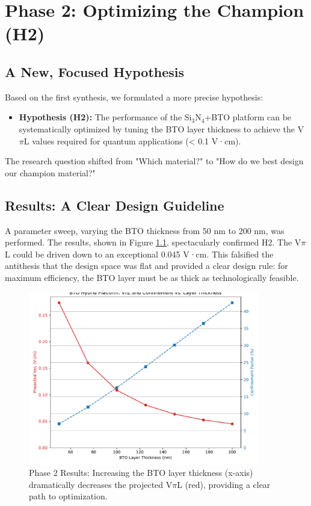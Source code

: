 \documentclass[12pt, a4paper, numbers]{report}
\begin{document}
\chapter{Phase 2: Optimizing the Champion (H2)}
\section{A New, Focused Hypothesis}
Based on the first synthesis, we formulated a more precise hypothesis:
\begin{itemize}
    \item \textbf{Hypothesis (H2):} The performance of the Si$_3$N$_4$+BTO platform can be systematically optimized by tuning the BTO layer thickness to achieve the V$\pi$L values required for quantum applications (< 0.1 V·cm).
\end{itemize}
The research question shifted from "Which material?" to "How do we best design our champion material?"

\section{Results: A Clear Design Guideline}
A parameter sweep, varying the BTO thickness from 50 nm to 200 nm, was performed. The results, shown in Figure \ref{fig:sweep}, spectacularly confirmed H2. The V$\pi$L could be driven down to an exceptional 0.045 V·cm. This falsified the antithesis that the design space was flat and provided a clear design rule: for maximum efficiency, the BTO layer must be as thick as technologically feasible.

\begin{figure}[htbp]
    \centering
    \includegraphics[width=0.9\textwidth]{simulation_v2_optimization_sweep.pdf}
    \caption{Phase 2 Results: Increasing the BTO layer thickness (x-axis) dramatically decreases the projected V$\pi$L (red), providing a clear path to optimization.}
    \label{fig:sweep}
\end{figure}
\end{document}
